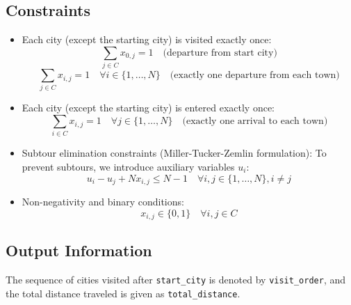\documentclass{article}
\begin{document}
\subsection*{Constraints}
\begin{itemize}
    \item Each city (except the starting city) is visited exactly once:
    \[
    \sum_{j \in C} x_{0,j} = 1 \quad \text{(departure from start city)}
    \]
    \[
    \sum_{j \in C} x_{i,j} = 1 \quad \forall i \in \{1, \ldots, N\} \quad \text{(exactly one departure from each town)}
    \]
    \item Each city (except the starting city) is entered exactly once:
    \[
    \sum_{i \in C} x_{i,j} = 1 \quad \forall j \in \{1, \ldots, N\} \quad \text{(exactly one arrival to each town)}
    \]
    \item Subtour elimination constraints (Miller-Tucker-Zemlin formulation):
      To prevent subtours, we introduce auxiliary variables $u_i$:
    \[
    u_i - u_j + N x_{i,j} \leq N-1 \quad \forall i,j \in \{1, \ldots, N\}, i \neq j
    \]
    \item Non-negativity and binary conditions:
    \[
    x_{i,j} \in \{0, 1\} \quad \forall i,j \in C
    \]
\end{itemize}

\subsection*{Output Information}
The sequence of cities visited after \texttt{start\_city} is denoted by \texttt{visit\_order}, and the total distance traveled is given as \texttt{total\_distance}.
\end{document}
